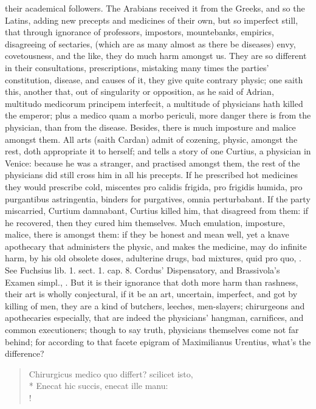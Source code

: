 {their academical followers. The Arabians received it from the Greeks,
and so the Latins, adding new precepts and medicines of their own, but
so imperfect still, that through ignorance of professors, impostors,
mountebanks, empirics, disagreeing of sectaries, (which are as many
almost as there be diseases) envy, covetousness, and the like, they do
much harm amongst us. They are so different in their consultations,
prescriptions, mistaking many times the parties' constitution,
disease, and causes of it, they give quite contrary physic;
one saith this, another that, out of singularity or opposition,
as he said of Adrian, multitudo medicorum principem interfecit, a
multitude of physicians hath killed the emperor; plus a medico quam a
morbo periculi, more danger there is from the physician, than from the
disease. Besides, there is much imposture and malice amongst them. All
arts (saith Cardan) admit of cozening, physic, amongst the rest,
doth appropriate it to herself; and tells a story of one Curtius, a
physician in Venice: because he was a stranger, and practised amongst
them, the rest of the physicians did still cross him in all his
precepts. If he prescribed hot medicines they would prescribe cold,
miscentes pro calidis frigida, pro frigidis humida, pro purgantibus
astringentia, binders for purgatives, omnia perturbabant. If the party
miscarried, Curtium damnabant, Curtius killed him, that disagreed from
them: if he recovered, then they cured him themselves. Much
emulation, imposture, malice, there is amongst them: if they be honest
and mean well, yet a knave apothecary that administers the physic, and
makes the medicine, may do infinite harm, by his old obsolete doses,
adulterine drugs, bad mixtures, quid pro quo, \etc{}. See Fuchsius lib. 1.
sect. 1. cap. 8. Cordus' Dispensatory, and Brassivola's Examen simpl.,
\etc{}. But it is their ignorance that doth more harm than rashness, their
art is wholly conjectural, if it be an art, uncertain, imperfect, and
got by killing of men, they are a kind of butchers, leeches,
men-slayers; chirurgeons and apothecaries especially, that are indeed
the physicians' hangman, carnifices, and common executioners; though to
say truth, physicians themselves come not far behind; for according to
that facete epigram of Maximilianus Urentius, what's the difference?
%
%
\begin{latin}%
\begin{verse}%
Chirurgicus medico quo differt? scilicet isto,\\*
Enecat hic succis, enecat ille manu:\\!


\end{verse}
\end{latin}}
